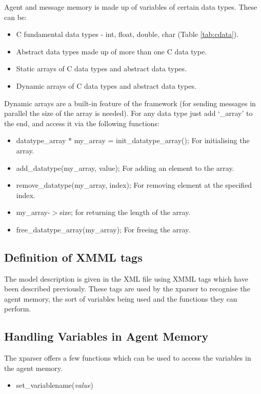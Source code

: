 \documentclass[a4paper,11pt]{article}
\begin{document}
Agent and message memory is made up of variables of certain data
types. These can be:
\begin{itemize}
\item C fundamental data types - int, float, double, char (Table
\ref{tab:cdata}).
\item Abstract data types made up of more than one C data type.
\item Static arrays of C data types and abstract data types.
    \item Dynamic arrays of C data types and abstract data types.
\end{itemize}
Dynamic arrays are a built-in feature of the framework (for sending
messages in parallel the size of the array is needed). For any data
type just add `\_array' to the end, and access it via the following
functions:
\begin{itemize}
 \item datatype\_array * my\_array = init\_datatype\_array();
    \subitem For initialising the array.

\item add\_datatype(my\_array, value);
\subitem For adding an element to the array.

\item remove\_datatype(my\_array, index);
\subitem For removing element at
the specified index.
\item my\_array-$>$size; \subitem for returning the length
of the array. \item free\_datatype\_array(my\_array); \subitem For
freeing the array.
\end{itemize}

\subsection{Definition of XMML tags}

The model description is given in the XML file using XMML tags which
have been described previously. These tags are used by the xparser
to recognise the agent memory, the sort of variables being used and
the functions they can perform.
\subsection{Handling Variables in Agent
Memory}

The xparser offers a few functions which can be used to access the
variables in the agent memory. \begin{itemize}
\item set\_variablename(\emph{value})
\end{itemize}
\end{document}
